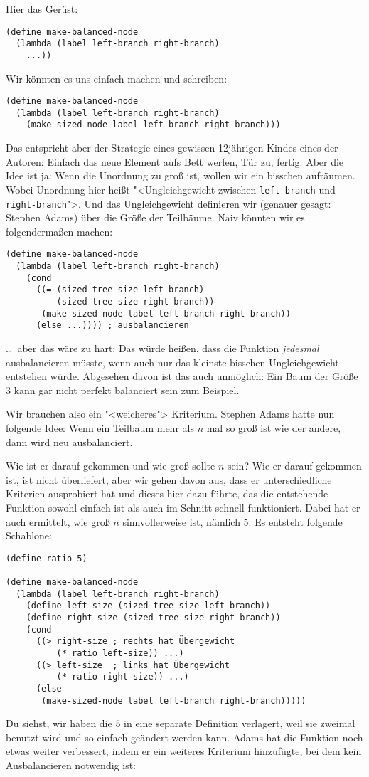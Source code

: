 %
Hier das Gerüst:
%
\begin{lstlisting}
(define make-balanced-node
  (lambda (label left-branch right-branch)
    ...))
\end{lstlisting}
%
Wir könnten es uns einfach machen und schreiben:
%
\begin{lstlisting}
(define make-balanced-node
  (lambda (label left-branch right-branch)
    (make-sized-node label left-branch right-branch)))
\end{lstlisting}
%
Das entspricht aber der Strategie eines gewissen 12jährigen Kindes
eines der Autoren: Einfach das neue Element aufs Bett werfen, Tür zu,
fertig.  Aber die Idee ist ja: Wenn die Unordnung zu groß ist, wollen
wir ein bisschen aufräumen.  Wobei Unordnung hier heißt
"<Ungleichgewicht zwischen \lstinline{left-branch} und
\lstinline{right-branch}">.  Und das Ungleichgewicht definieren wir
(genauer gesagt: Stephen Adams) über die Größe der Teilbäume.
Naiv könnten wir es folgendermaßen machen:
%
\begin{lstlisting}
(define make-balanced-node
  (lambda (label left-branch right-branch)
    (cond
      ((= (sized-tree-size left-branch)
          (sized-tree-size right-branch))
       (make-sized-node label left-branch right-branch))
      (else ...)))) ; ausbalancieren
\end{lstlisting}
%
\ldots~aber das wäre zu hart: Das würde heißen, dass die Funktion
\emph{jedesmal} ausbalancieren müsste, wenn auch nur das kleinste
bisschen Ungleichgewicht entstehen würde.  Abgesehen davon ist das
auch unmöglich: Ein Baum der Größe $3$ kann gar nicht perfekt balanciert
sein zum Beispiel.

Wir brauchen also ein "<weicheres"> Kriterium.  Stephen Adams hatte
nun folgende Idee: Wenn ein Teilbaum mehr als $n$ mal so groß ist wie
der andere, dann wird neu ausbalanciert.

Wie ist er darauf gekommen
und wie groß sollte $n$ sein?  Wie er darauf gekommen ist, ist
nicht überliefert, aber wir gehen davon aus, dass er unterschiedliche
Kriterien ausprobiert hat und dieses hier dazu führte, das die
entstehende Funktion sowohl einfach ist als auch im Schnitt schnell
funktioniert.  Dabei hat er auch ermittelt, wie groß $n$
sinnvollerweise ist, nämlich 5.  Es entsteht folgende Schablone:\label{def:ratio}
%
\begin{lstlisting}
(define ratio 5)

(define make-balanced-node
  (lambda (label left-branch right-branch)
    (define left-size (sized-tree-size left-branch))
    (define right-size (sized-tree-size right-branch))
    (cond
      ((> right-size ; rechts hat Übergewicht
          (* ratio left-size)) ...) 
      ((> left-size  ; links hat Übergewicht
          (* ratio right-size)) ...)
      (else
       (make-sized-node label left-branch right-branch)))))
\end{lstlisting}
%
Du siehst, wir haben die $5$ in eine separate Definition verlagert, weil
sie zweimal benutzt wird und so einfach geändert werden kann.  Adams
hat die Funktion noch etwas weiter verbessert, indem er ein weiteres
Kriterium hinzufügte, bei dem kein Ausbalancieren notwendig ist:

